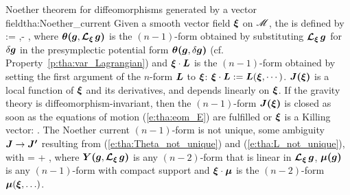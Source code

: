 \begin{tprop}{Noether theorem for diffeomorphisms generated by a vector field}{tha:Noether_current}
Given a smooth vector field $\bm{\xi}$ on $\mathscr{M}$,
the  is defined by \cite{Wald93,IyerW94}
\be \label{e:tha:def_Noether_current}
    \lld\w{\xi}\rld := \w{\theta}\lld{},\Lie{\xi}\rld - \w{\xi}\cdot{} ,
\ee
where $\bm{\theta}\textbf{(}\bm{g},\bm{\mathcal{L}}_{\bm{\xi}}\,\bm{g}\textbf{)}$ is the $(n-1)$-form obtained
by substituting $\bm{\mathcal{L}}_{\bm{\xi}}\,\bm{g}$ for $\delta\bm{g}$ in the
presymplectic potential form $\bm{\theta}\textbf{(}\bm{g},\delta\bm{g}\textbf{)}$
(cf. Property~\ref{p:tha:var_Lagrangian}) and $\bm{\xi}\cdot\bm{L}$
is the $(n-1)$-form obtained by setting the first argument of the $n$-form $\bm{L}$
to $\bm{\xi}$:  $\bm{\xi}\cdot\bm{L} := \bm{L}(\bm{\xi},\cdots)$.
$\bm{J}\textbf{(}\bm{\xi}\textbf{)}$ is a local function of $\bm{\xi}$ and its derivatives,
and depends linearly on $\bm{\xi}$.
If the gravity theory is diffeomorphism-invariant, then
the $(n-1)$-form $\bm{J}\textbf{(}\bm{\xi}\textbf{)}$ is closed as soon as the equations of motion (\ref{e:tha:eom_E}) are fulfilled  or $\bm{\xi}$ is a Killing vector:
\be \label{e:tha:J_closed}
    .
\ee
The Noether current $(n-1)$-form is not unique,
some ambiguity $\bm{J} \to \bm{J'}$ resulting from (\ref{e:tha:Theta_not_unique})
and (\ref{e:tha:L_not_unique}), with
\be \label{e:tha:J_not_unique}
     \lld\w{\xi}\rld =  \lld\w{\xi}\rld  + \dd {},
\ee
where $\bm{Y}\textbf{(}\bm{g},\bm{\mathcal{L}}_{\bm{\xi}}\,\bm{g}\textbf{)}$ is any $(n-2)$-form that is linear in $\bm{\mathcal{L}}_{\bm{\xi}}\,\bm{g}$,
$\bm{\mu}\textbf{(}\bm{g}\textbf{)}$ is any $(n-1)$-form with compact support and $\bm{\xi}\cdot\bm{\mu}$
is the $(n-2)$-form $\bm{\mu}(\bm{\xi},\ldots)$.
\end{tprop}

